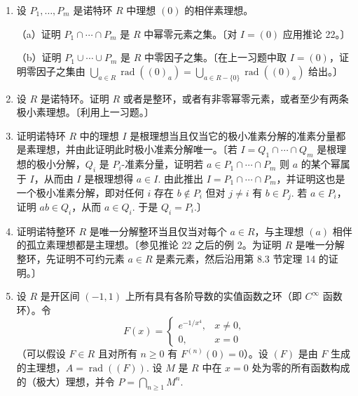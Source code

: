 \begin{enumerate}
（d）对每个 \(i = 1, \ldots, m\)，证明存在 \(a \in R\) 使 \(\operatorname{rad}(I_a) = P_i\).〔证明存在 \(a \in R\) 使 \(a \notin Q_i\) 但对所有 \(j \neq i\) 有 \(a \in Q_j\).〕

（e）由（c）与（d）证明极小准素分解的相伴素理想恰是理想族 \(\operatorname{rad}(I_a)\)（\(a \in R\)）中的素理想，并由此推出它们由 \(I\) 唯一确定，不依赖于极小准素分解。

\item 设 \(P_1, \ldots, P_m\) 是诺特环 \(R\) 中理想 \((0)\) 的相伴素理想。

（a）证明 \(P_1 \cap \cdots \cap P_m\) 是 \(R\) 中幂零元素之集。〔对 \(I = (0)\) 应用推论 22。〕

（b）证明 \(P_1 \cup \cdots \cup P_m\) 是 \(R\) 中零因子之集。〔在上一习题中取 \(I = (0)\)，证明零因子之集由 \(\bigcup_{a \in R}\operatorname{rad}((0)_a) = \bigcup_{a \in R-\{0\}}\operatorname{rad}((0)_a)\) 给出。〕

\item 设 \(R\) 是诺特环。证明 \(R\) 或者是整环，或者有非零幂零元素，或者至少有两条极小素理想。〔利用上一习题。〕

\item 证明诺特环 \(R\) 中的理想 \(I\) 是根理想当且仅当它的极小准素分解的准素分量都是素理想，并由此证明此时极小准素分解唯一。〔若 \(I = Q_1 \cap \cdots \cap Q_m\) 是根理想的极小分解，\(Q_i\) 是 \(P_i\)-准素分量，证明若 \(a \in P_1 \cap \cdots \cap P_m\) 则 \(a\) 的某个幂属于 \(I\)，从而由 \(I\) 是根理想得 \(a \in I\). 由此推出 \(I = P_1 \cap \cdots \cap P_m\)，并证明这也是一个极小准素分解，即对任何 \(i\) 存在 \(b \notin P_i\) 但对 \(j \neq i\) 有 \(b \in P_j\). 若 \(a \in P_i\)，证明 \(ab \in Q_i\)，从而 \(a \in Q_i\). 于是 \(Q_i = P_i\).〕

\item 证明诺特整环 \(R\) 是唯一分解整环当且仅当对每个 \(a \in R\)，与主理想 \((a)\) 相伴的孤立素理想都是主理想。〔参见推论 22 之后的例 2。为证明 \(R\) 是唯一分解整环，先证明不可约元素 \(a \in R\) 是素元素，然后沿用第 8.3 节定理 14 的证明。〕

\item 设 \(R\) 是开区间 \((-1,1)\) 上所有具有各阶导数的实值函数之环（即 \(C^\infty\) 函数环）。令
\[
F(x) = \begin{cases} e^{-1/x^4}, & x \neq 0,\\ 0, & x = 0 \end{cases}
\]
（可以假设 \(F \in R\) 且对所有 \(n \geq 0\) 有 \(F^{(n)}(0) = 0\)）。设 \((F)\) 是由 \(F\) 生成的主理想，\(A = \operatorname{rad}((F))\). 设 \(M\) 是 \(R\) 中在 \(x = 0\) 处为零的所有函数构成的（极大）理想，并令 \(P = \bigcap_{n \geq 1}M^n\).


\end{enumerate}
